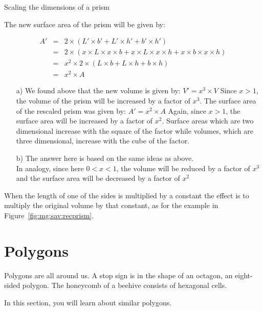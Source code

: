 \documentclass[10pt,a4paper,titlepage,twoside,openright]{report}
\begin{document}
\begin{wex}{Scaling the dimensions of a prism}
{The new surface area of the prism will be given by:

\begin{eqnarray*}
A'  &=& 2   \times (L'\times b'+L'\times h'+ b'\times h') \\
    &=& 2   \times (x\times L\times x\times b+x\times L\times x\times h+ x\times b\times x\times h) \\
    &=& x^2 \times 2\times (L\times b+L\times h+ b\times h) \\
    &=& x^2 \times A
\end{eqnarray*}


\begin{enumerate}
\item[a)]
We found above that the new volume is given by:
$V'=x^3\times V$
Since $x>1$, the volume of the prism will be increased by a factor of $x^3$.
The surface area of the rescaled prism was given by:
$A'=x^2\times A$
Again, since $x>1$, the surface area will be increased by a factor of $x^2$. Surface areas which are two dimensional increase with the square of the factor while volumes, which are three dimensional, increase with the cube of the factor.
\item[b)]
The answer here is based on the same ideas as above.\\
In analogy, since here $0<x<1$, the volume will be reduced by a factor of $x^3$ and the surface area will be decreased by a factor of $x^2$
\end{enumerate}
}
\end{wex}

When the length of one of the sides is multiplied by a constant the effect is to multiply the original volume by that constant, as for the example in Figure~\ref{fig:mg:sav:recprism}.


\section{Polygons}
\label{mg:p}
Polygons are all around us. A stop sign is in the shape of an octagon, an eight-sided polygon. The honeycomb of a beehive consists of hexagonal cells. 

In this section, you will learn about similar polygons. 

\end{document}
